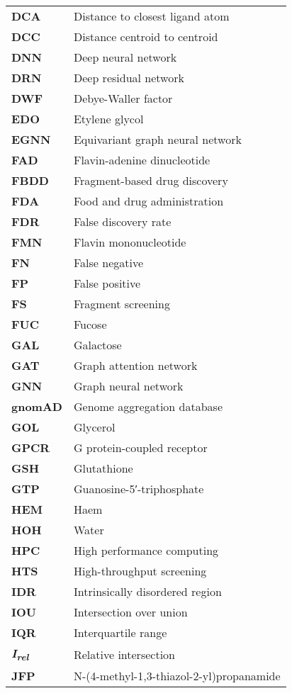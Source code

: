 \begin{longtable}[l]{@{}p{2.5cm}p{12cm}@{}}
\textbf{DCA} & Distance to closest ligand atom \\
\textbf{DCC} & Distance centroid to centroid \\
\textbf{DNN} & Deep neural network \\
\textbf{DRN} & Deep residual network \\
\textbf{DWF} & Debye-Waller factor \\
\textbf{EDO} & Etylene glycol \\
\textbf{EGNN} & Equivariant graph neural network \\
\textbf{FAD} & Flavin-adenine dinucleotide \\
\textbf{FBDD} & Fragment-based drug discovery \\
\textbf{FDA} & Food and drug administration \\
\textbf{FDR} & False discovery rate \\
\textbf{FMN} & Flavin mononucleotide \\
\textbf{FN} & False negative \\
\textbf{FP} & False positive \\
\textbf{FS} & Fragment screening \\
\textbf{FUC} & Fucose \\
\textbf{GAL} & Galactose \\
\textbf{GAT} & Graph attention network \\
\textbf{GNN} & Graph neural network \\
\textbf{gnomAD} & Genome aggregation database \\
\textbf{GOL} & Glycerol \\
\textbf{GPCR} & G protein-coupled receptor \\
\textbf{GSH} & Glutathione \\
\textbf{GTP} & Guanosine-5′-triphosphate \\
\textbf{HEM} & Haem \\
\textbf{HOH} & Water \\
\textbf{HPC} & High performance computing \\
\textbf{HTS} & High-throughput screening \\
\textbf{IDR} & Intrinsically disordered region \\
\textbf{IOU} & Intersection over union \\
\textbf{IQR} & Interquartile range \\
\textbf{\textit{I\textsubscript{rel}}} & Relative intersection \\
\textbf{JFP} & N-(4-methyl-1,3-thiazol-2-yl)propanamide \\

\end{longtable}
